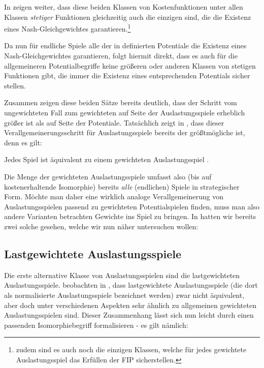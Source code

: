 In \cite[Theorem 5.1]{CharExNGinWCG} zeigen \citeauthor{CharExNGinWCG} weiter, dass diese beiden Klassen von Kostenfunktionen unter allen Klassen \emph{stetiger} Funktionen gleichzeitig auch die einzigen sind, die die Existenz eines Nash-Gleichgewichtes garantieren.\footnote{zudem sind es auch noch die einzigen Klassen, welche für jedes gewichtete Auslastungsspiel das Erfüllen der FIP sicherstellen.}

Da nun für endliche Spiele alle der in  definierten Potentiale die Existenz eines Nash-Gleichgewichtes garantieren, folgt hiermit direkt, dass es auch für die allgemeineren Potentialbegriffe keine größeren oder anderen Klassen von stetigen Funktionen gibt, die immer die Existenz eines entsprechenden Potentials sicher stellen.

Zusammen zeigen diese beiden Sätze bereits deutlich, dass der Schritt vom ungewichteten Fall zum gewichteten auf Seite der Auslastungsspiele erheblich größer ist als auf Seite der Potentiale. Tatsächlich zeigt \citeauthor{ReprOfFiniteGamesAsNCG} in \cite{ReprOfFiniteGamesAsNCG}, dass dieser Verallgemeinerungsschritt für Auslastungsspiele bereits der größtmögliche ist, denn es gilt:

\begin{satz}
	Jedes Spiel ist äquivalent zu einem gewichteten Auslastungsspiel .
\end{satz}

Die Menge der gewichteten Auslastungsspiele umfasst also (bis auf kostenerhaltende Isomorphie) bereits \emph{alle} (endlichen) Spiele in strategischer Form. Möchte man daher eine wirklich analoge Verallgemeinerung von Auslastungsspielen passend zu gewichteten Potentialspielen finden, muss man also andere Varianten betrachten Gewichte ins Spiel zu bringen. In  hatten wir bereits zwei solche gesehen, welche wir nun näher untersuchen wollen:

\subsection{Lastgewichtete Auslastungsspiele}

Die erste alternative Klasse von Auslastungsspielen sind die lastgewichteten Auslastungsspiele. \citeauthor{CharExGewPotinWCG} beobachten in \cite{CharExGewPotinWCG}, dass lastgewichtete Auslastungsspiele (die dort als normalisierte Auslastungsspiele bezeichnet werden) zwar nicht äquivalent, aber doch unter verschiedenen Aspekten sehr ähnlich zu allgemeinen gewichteten Auslastungsspielen sind. Dieser Zusammenhang lässt sich nun leicht durch einen passenden Isomorphiebegriff formalisieren - es gilt nämlich:

